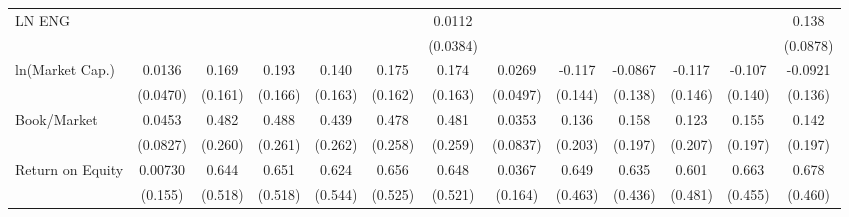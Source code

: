 {\begin{tabular}{l*{12}{c}}
LN ENG              &                     &                     &                     &                     &                     &      0.0112         &                     &                     &                     &                     &                     &       0.138         \\
                    &                     &                     &                     &                     &                     &    (0.0384)         &                     &                     &                     &                     &                     &    (0.0878)         \\
ln(Market Cap.)     &      0.0136         &       0.169         &       0.193         &       0.140         &       0.175         &       0.174         &      0.0269         &      -0.117         &     -0.0867         &      -0.117         &      -0.107         &     -0.0921         \\
                    &    (0.0470)         &     (0.161)         &     (0.166)         &     (0.163)         &     (0.162)         &     (0.163)         &    (0.0497)         &     (0.144)         &     (0.138)         &     (0.146)         &     (0.140)         &     (0.136)         \\
Book/Market         &      0.0453         &       0.482\sym{*}  &       0.488\sym{*}  &       0.439\sym{*}  &       0.478\sym{*}  &       0.481\sym{*}  &      0.0353         &       0.136         &       0.158         &       0.123         &       0.155         &       0.142         \\
                    &    (0.0827)         &     (0.260)         &     (0.261)         &     (0.262)         &     (0.258)         &     (0.259)         &    (0.0837)         &     (0.203)         &     (0.197)         &     (0.207)         &     (0.197)         &     (0.197)         \\
Return on Equity    &     0.00730         &       0.644         &       0.651         &       0.624         &       0.656         &       0.648         &      0.0367         &       0.649         &       0.635         &       0.601         &       0.663         &       0.678         \\
                    &     (0.155)         &     (0.518)         &     (0.518)         &     (0.544)         &     (0.525)         &     (0.521)         &     (0.164)         &     (0.463)         &     (0.436)         &     (0.481)         &     (0.455)         &     (0.460)         \\

\end{tabular}}
